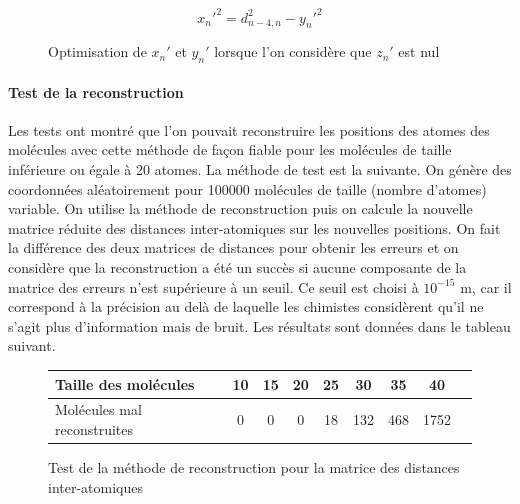 \begin{figure}[!h]
	\centering

	\[
		x_n'^2 = d_{n-4,n}^2 - y_n'^2
	\]

	\caption{Optimisation de $x_n'$ et $y_n'$ lorsque l'on considère que $z_n'$ est nul}
\end{figure}

\paragraph{Test de la reconstruction}
Les tests ont montré que l'on pouvait reconstruire les positions des atomes des molécules avec cette méthode de façon fiable pour les molécules de taille inférieure ou égale à 20 atomes. La méthode de test est la suivante. On génère des coordonnées aléatoirement pour 100000 molécules de taille (nombre d'atomes) variable. On utilise la méthode de reconstruction puis on calcule la nouvelle matrice réduite des distances inter-atomiques sur les nouvelles positions. On fait la différence des deux matrices de distances pour obtenir les erreurs et on considère que la reconstruction a été un succès si aucune composante de la matrice des erreurs n'est supérieure à un seuil. Ce seuil est choisi à $10^{-15}$ m, car il correspond à la précision au delà de laquelle les chimistes considèrent qu'il ne s'agit plus d'information mais de bruit. Les résultats sont données dans le tableau suivant.

\begin{figure}[!h]
	\centering
	
	\begin{tabular}{|l|c|c|c|c|c|c|c|c|}
		\hline
		Taille des molécules & 10 & 15 & 20 & 25 & 30 & 35 & 40 \\ \hline
		Molécules mal reconstruites & 0 & 0 & 0 & 18 & 132 & 468 & 1752\\ \hline
	
	\end{tabular}

	\caption{Test de la méthode de reconstruction pour la matrice des distances inter-atomiques}
\end{figure}